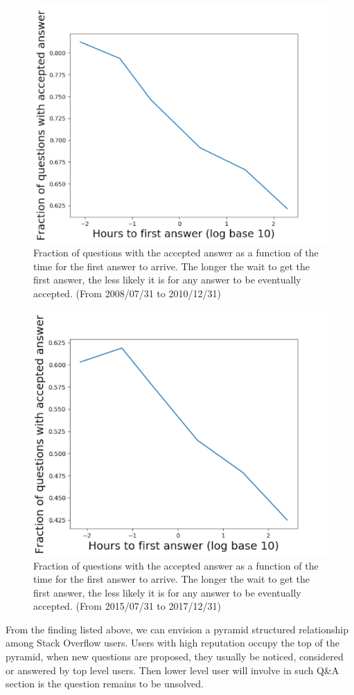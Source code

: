 \begin{figure}[!t]
    \centering
    \includegraphics[width=0.7\columnwidth]{img/Fig2_2010.pdf}
    \caption{Fraction of questions with the accepted answer as a function of the time for the first answer to arrive. The longer the wait to get the first answer, the less likely it is for any answer to be eventually accepted. (From 2008/07/31 to 2010/12/31)}
    \label{fig:fig2_2010}
\end{figure}

\begin{figure}[!t]
    \centering
    \includegraphics[width=0.7\columnwidth]{img/Fig2_2017.pdf}
    \caption{Fraction of questions with the accepted answer as a function of the time for the first answer to arrive. The longer the wait to get the first answer, the less likely it is for any answer to be eventually accepted. (From 2015/07/31 to 2017/12/31)}
    \label{fig:fig2_2017}
\end{figure}
From the finding listed above, we can envision a pyramid structured relationship among Stack Overflow users.  Users with high reputation occupy the top of the pyramid, when new questions are proposed, they usually be noticed, considered or answered by top level users. Then lower level user will involve in such Q\&A section is the question remains to be unsolved. 

